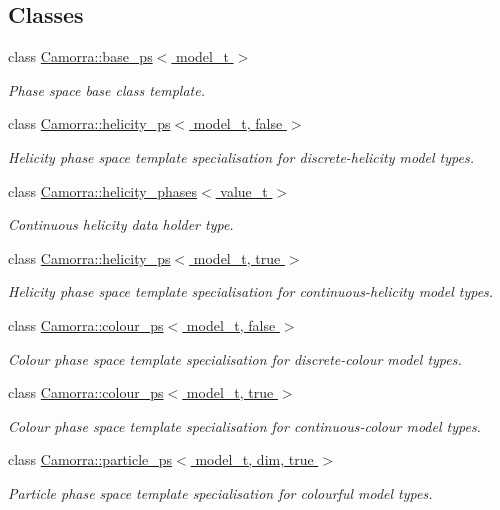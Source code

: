 \subsection*{Classes}
\begin{DoxyCompactItemize}
\item 
class \hyperlink{a00021}{Camorra::base\_\-ps$<$ model\_\-t $>$}
\begin{DoxyCompactList}\small\item\em Phase space base class template. \end{DoxyCompactList}\item 
class \hyperlink{a00251}{Camorra::helicity\_\-ps$<$ model\_\-t, false $>$}
\begin{DoxyCompactList}\small\item\em Helicity phase space template specialisation for discrete-\/helicity model types. \end{DoxyCompactList}\item 
class \hyperlink{a00250}{Camorra::helicity\_\-phases$<$ value\_\-t $>$}
\begin{DoxyCompactList}\small\item\em Continuous helicity data holder type. \end{DoxyCompactList}\item 
class \hyperlink{a00252}{Camorra::helicity\_\-ps$<$ model\_\-t, true $>$}
\begin{DoxyCompactList}\small\item\em Helicity phase space template specialisation for continuous-\/helicity model types. \end{DoxyCompactList}\item 
class \hyperlink{a00080}{Camorra::colour\_\-ps$<$ model\_\-t, false $>$}
\begin{DoxyCompactList}\small\item\em Colour phase space template specialisation for discrete-\/colour model types. \end{DoxyCompactList}\item 
class \hyperlink{a00081}{Camorra::colour\_\-ps$<$ model\_\-t, true $>$}
\begin{DoxyCompactList}\small\item\em Colour phase space template specialisation for continuous-\/colour model types. \end{DoxyCompactList}\item 
class \hyperlink{a00373}{Camorra::particle\_\-ps$<$ model\_\-t, dim, true $>$}
\begin{DoxyCompactList}\small\item\em Particle phase space template specialisation for colourful model types. \end{DoxyCompactList}\item 

\end{DoxyCompactItemize}
